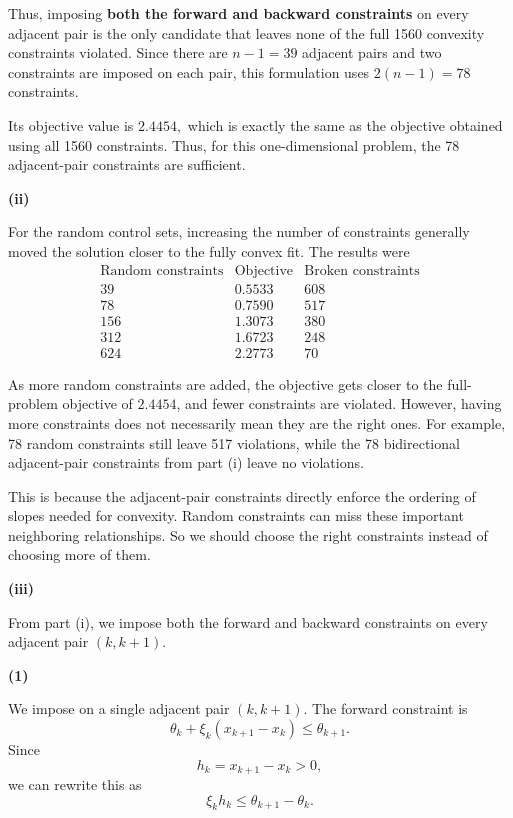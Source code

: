 \documentclass{article}
\begin{document}
Thus, imposing \textbf{both the forward and backward constraints} on every
adjacent pair is the only candidate that leaves none of the full 1560
convexity constraints violated. Since there are $n-1=39$ adjacent pairs
and two constraints are imposed on each pair, this formulation uses
$
2(n-1)=78
$
constraints.

Its objective value is
$
2.4454,
$
which is exactly the same as the objective obtained using all 1560
constraints. Thus, for this one-dimensional problem, the 78 adjacent-pair constraints are sufficient. 


\vspace{5mm}
\textbf{(ii)}

For the random control sets, increasing the number of constraints
generally moved the solution closer to the fully convex fit. The results
were
\[
\begin{array}{c|c|c}
\text{Random constraints}
& \text{Objective}
& \text{Broken constraints}\\
\hline
39  & 0.5533 & 608\\
78  & 0.7590 & 517\\
156 & 1.3073 & 380\\
312 & 1.6723 & 248\\
624 & 2.2773 & 70
\end{array}
\]

As more random constraints are added, the objective gets closer to the
full-problem objective of $2.4454$, and fewer constraints are violated.
However, having more constraints does not necessarily mean they are the
right ones. For example, 78 random constraints still leave 517
violations, while the 78 bidirectional adjacent-pair constraints from
part (i) leave no violations.

This is because the adjacent-pair constraints directly enforce the
ordering of slopes needed for convexity. Random constraints can miss
these important neighboring relationships. So we should choose the right constraints instead of choosing more of them. 

\newpage


\textbf{(iii)}

From part (i), we impose both the forward and backward constraints on
every adjacent pair $(k,k+1)$.

\textbf{(1)}

We impose on a single adjacent pair $(k, k+1)$. The forward constraint is
\[
\theta_k+\xi_k(x_{k+1}-x_k)\leq\theta_{k+1}.
\]
Since
\[
h_k=x_{k+1}-x_k>0,
\]
we can rewrite this as
\[
\xi_k h_k\leq\theta_{k+1}-\theta_k.
\]
\end{document}
